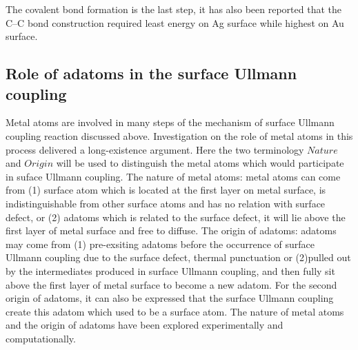 \documentclass[%
 reprint,
 amsmath,amssymb,
 aps,
prb,
]{revtex4-2}
\begin{document}
The covalent bond formation is the last step, it has also been reported that the C--C bond construction required least energy on Ag surface while highest on Au surface.  

\subsection{Role of adatoms in the surface Ullmann coupling} 

Metal atoms are involved in many steps of the mechanism of surface Ullmann coupling reaction discussed above. Investigation on the role of metal atoms in this process delivered a long-existence argument.
Here the two terminology $Nature$ and $Origin$ will be used to distinguish the metal atoms which would participate in suface Ullmann coupling.
The nature of metal atoms: metal atoms can come from (1) surface atom which is located at the first layer on metal surface, is indistinguishable from other surface atoms and has no relation with surface defect, or (2) adatoms which is related to the surface defect, it will lie above the first layer of metal surface and free to diffuse.
The origin of adatoms: adatoms may come from (1) pre-exsiting adatoms before the occurrence of surface Ullmann coupling due to the surface defect, thermal punctuation or (2)pulled out by the intermediates produced in surface Ullmann coupling, and then fully sit above the first layer of metal surface to become a new adatom. For the second origin of adatoms, it can also be expressed that the surface Ullmann coupling create this adatom which used to be a surface atom. The nature of metal atoms and the origin of adatoms have been explored experimentally and computationally.
\end{document}
